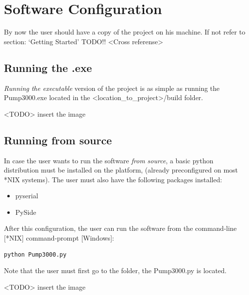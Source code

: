 \documentclass[letterpaper,10pt,english]{sphinxmanual}
\begin{document}
\section{Software Configuration}
\label{installation:software-configuration}\label{installation::doc}
By now the user should have a copy of the project on his machine. If not refer
to section: `Getting Started' TODO!! \textless{}Cross referense\textgreater{}


\subsection{Running the .exe}
\label{installation:running-the-exe}
\emph{Running the executable} version of the project is as simple as running the Pump3000.exe
located in the \textless{}location\_to\_project\textgreater{}/build folder.

\textless{}TODO\textgreater{} insert the image


\subsection{Running from source}
\label{installation:running-from-source}
In case the user wants to run the software \emph{from source}, a basic python distribution
must be installed on the platform, (already preconfigured on most *NIX systems).
The user must also have the following packages installed:
\begin{itemize}
\item {} 
pyserial

\item {} 
PySide

\end{itemize}

After this configuration, the user can run the software from the command-line {[}*NIX{]}
command-prompt {[}Windows{]}:

\begin{Verbatim}[commandchars=\\\{\}]
python Pump3000.py
\end{Verbatim}

Note that the user must first go to the folder, the Pump3000.py is located.

\textless{}TODO\textgreater{} insert the image
\end{document}
